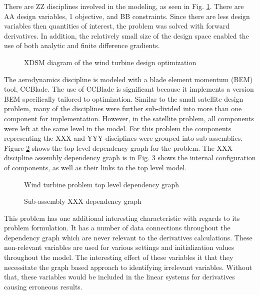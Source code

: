 \documentclass[]{aiaa-tc} %
\begin{document}
    There are ZZ disciplines involved in the modeling, as seen in Fig. \ref{fig:xdsm_wt}.
    There are AA design variables, 1 objective, and BB constraints. Since there are
    less design variables then quantities of interest, the problem was solved with
    forward derivatives. In addition, the relatively small size of the design space
    enabled the use of both analytic and finite difference gradients.


    \begin{figure}[!htbp]
        \caption{XDSM diagram of the wind turbine design optimization}
        \label{fig:xdsm_wt}
    \end{figure}

    The aerodynamics discipline is modeled with a blade element
    momentum (BEM) tool, CCBlade\cite{NING:BEM}. The use of CCBlade is significant because
    it implements a version BEM specifically tailored to optimization.
    Similar to the small satellite design problem, many of the disciplines were further
    sub-divided into more than one component for implementation. However, in the
    satellite problem, all components were left at the same level in the model. For this
    problem the components representing the XXX and YYY disciplines were
    grouped into sub-assemblies. Figure \ref{fig:wt_top_depgraph} shows the
    top level dependency graph for the problem. The XXX discipline assembly dependency
    graph is in Fig. \ref{fig:wt_sub_depgraph} shows the internal configuration
    of components, as well as their links to the top level model.

    \begin{figure}[!htbp]
        \caption{Wind turbine problem top level dependency graph}
        \label{fig:wt_top_depgraph}
    \end{figure}

    \begin{figure}[!htbp]
        \caption{Sub-assembly XXX dependency graph}
        \label{fig:wt_sub_depgraph}
    \end{figure}


    This problem has one additional interesting characteristic with regards to its
    problem formulation. It has a number of data connections throughout the dependency
    graph which are never relevant to the derivatives calculations. These non-relevant
    variables are used for various settings and initialization values throughout the
    model. The interesting effect of these variables it that they necessitate the
    graph based approach to identifying irrelevant variables. Without that, these
    variables would be included in the linear systems for derivatives causing erroneous
    results.
\end{document}
